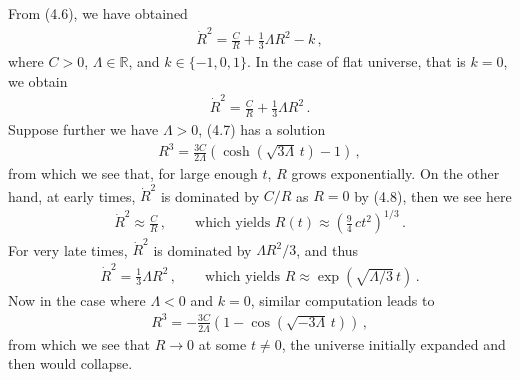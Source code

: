 \documentclass[11pt, onesided]{book}
\theoremstyle{break}
\theoremstyle{break}
\newcommand{\R}{\mathbb{R}}
\begin{document}
\newpage
From (4.6), we have obtained
\begin{align*}
\dot{R}^2 = \frac{C}{R} + \frac{1}{3}\Lambda R^2 - k\,,
\end{align*}
where $C>0$, $\Lambda \in \R$, and $k \in \{-1,0,1\}$. In the case of flat universe, that is $k = 0$, we obtain
\begin{align}
\dot{R}^2 = \frac{C}{R} + \frac{1}{3}\Lambda R^2\,.
\end{align}
Suppose further we have $\Lambda>0$, (4.7) has a solution
\begin{align}
R^3 = \frac{3C}{2\Lambda}\left( \cosh(\sqrt{3\Lambda}\, t) -1\right) \,,
\end{align}
from which we see that, for large enough $t$, $R$ grows exponentially. On the other hand, at early times, $\dot{R}^2$ is dominated by $C/R$ as $R = 0$ by (4.8), then we see here
\begin{align*}
\dot{R}^2 \approx \frac{C}{R}\,,\qquad \text{which yields }
R(t) \approx \left( \frac{9}{4}\, ct^2\right)^{1/3}\,.
\end{align*}
For very late times, $\dot{R}^2$ is dominated by $\Lambda R^2 /3$, and thus
\begin{align*}
\dot{R}^2 = \frac{1}{3}\Lambda R^2 \,,\qquad \text{which yields }
R\approx \exp\left( \sqrt{\Lambda/3 }\,t\right)\,.
\end{align*}
Now in the case where $\Lambda < 0$ and $k=0$, similar computation leads to
\begin{align}
R^3 = -\frac{3C}{2\Lambda}\left(1 - \cos(\sqrt{-3 \Lambda}\, t) \right)\,,
\end{align}
from which we see that $R \to 0$ at some $t \neq 0$, the universe initially expanded and then would collapse.\\

\newpage
\end{document}
